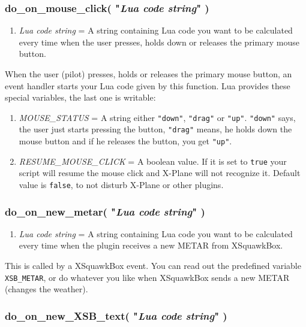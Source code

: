 \documentclass[11pt,parskip=half,a4paper]{scrartcl}
\begin{document}
\subsubsection{do\_on\_mouse\_click( "\emph{Lua code string}" )}

\begin{enumerate}
	\item \emph{Lua code string} = A string containing Lua code you want to be calculated every time when the user presses, holds down or releases the primary mouse button.
\end{enumerate}

When the user (pilot) presses, holds or releases the primary mouse button, an event handler starts your Lua code given by this function. Lua provides these special variables, the last one is writable:

\begin{enumerate}
	\item \emph{MOUSE\_STATUS} = A string either \verb|"down"|, \verb|"drag"| or \verb|"up"|. \verb|"down"| says, the user just starts pressing the button, \verb|"drag"| means, he holds down the mouse button and if he releases the button, you get \verb|"up"|.
	\item \emph{RESUME\_MOUSE\_CLICK} = A boolean value. If it is set to \verb|true| your script will resume the mouse click and X-Plane will not recognize it. Default value is \verb|false|, to not disturb X-Plane or other plugins.
\end{enumerate}


\subsubsection{do\_on\_new\_metar( "\emph{Lua code string}" )}

\begin{enumerate}
	\item \emph{Lua code string} = A string containing Lua code you want to be calculated every time when the plugin receives a new METAR from XSquawkBox.
\end{enumerate}

This is called by a XSquawkBox event. You can read out the predefined variable \verb|XSB_METAR|, or do whatever you like when XSquawkBox sends a new METAR (changes the weather).


\subsubsection{do\_on\_new\_XSB\_text( "\emph{Lua code string}" )}
\end{document}

